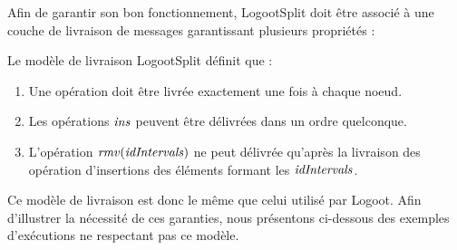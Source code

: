 \label{sec:logootsplit-delivery-model}

Afin de garantir son bon fonctionnement, LogootSplit doit être associé à une couche de livraison de messages garantissant plusieurs propriétés :

\begin{definition}
    Le modèle de livraison LogootSplit définit que :
    \begin{enumerate}
      \item Une opération doit être livrée exactement une fois à chaque noeud.
      \item Les opérations $\mathit{ins}$ peuvent être délivrées dans un ordre quelconque.
      \item L'opération $\mathit{rmv}(\mathit{idIntervals})$ ne peut délivrée qu'après la livraison des opération d'insertions des éléments formant les $\mathit{idIntervals}$.
    \end{enumerate}
\end{definition}

Ce modèle de livraison est donc le même que celui utilisé par Logoot.
Afin d'illustrer la nécessité de ces garanties, nous présentons ci-dessous des exemples d'exécutions ne respectant pas ce modèle.
